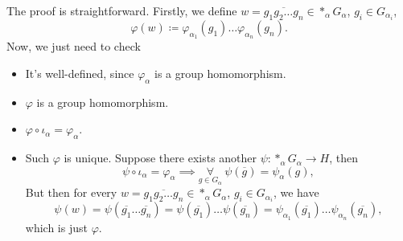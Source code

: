 \begin{explanation}
	The proof is straightforward. Firstly, we define \(w = \overline{g_1 g_2\ldots g_n}\in \ast_\alpha G_\alpha\), \(g_{i} \in G_{\alpha_{i} } \),
	\[
		\varphi (w)\coloneqq \varphi _{\alpha _1}(g_1)\ldots \varphi _{\alpha _{n} }(g_{n} ).
	\]
	Now, we just need to check
	\begin{itemize}
		\item It's well-defined, since \(\varphi_\alpha \) is a group homomorphism.
		\item \(\varphi \) is a group homomorphism.
		\item \(\varphi \circ \iota _\alpha =\varphi _\alpha \).
		\item Such \(\varphi \) is unique. Suppose there exists another \(\psi \colon \ast_\alpha G_\alpha \to H\), then
		      \[
			      \psi \circ \iota _\alpha = \varphi _\alpha \implies \underset{g\in G_\alpha }{\forall }\ \psi (\overline{g} )= \psi _\alpha (g),
		      \]
		      But then for every \(w = \overline{g_1 g_2\ldots g_n}\in \ast_\alpha G_\alpha\), \(g_{i} \in G_{\alpha_{i} } \), we have
		      \[
			      \psi (w) = \psi (\overline{g_1}\ldots \overline{g_n}) = \psi (\overline{g_1}) \ldots \psi (\overline{g_n})  = \psi _{\alpha _1}(\overline{g_1}) \ldots \psi _{\alpha_n}(\overline{g_n}),
		      \]
		      which is just \(\varphi \).
	\end{itemize}
\end{explanation}

